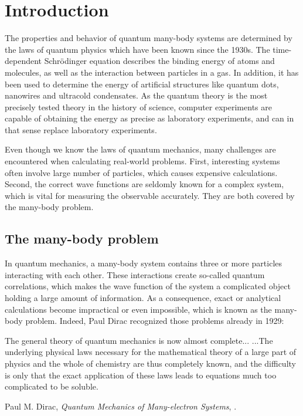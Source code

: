\chapter{Introduction}
The properties and behavior of quantum many-body systems are determined by the laws of quantum physics which have been known since the 1930s. The time-dependent Schrödinger equation describes the binding energy of atoms and molecules, as well as the interaction between particles in a gas. In addition, it has been used to determine the energy of artificial structures like quantum dots, nanowires and ultracold condensates. As the quantum theory is the most precisely tested theory in the history of science, computer experiments are capable of obtaining the energy as precise as laboratory experiments, and can in that sense replace laboratory experiments. 



Even though we know the laws of quantum mechanics, many challenges are encountered when calculating real-world problems. First, interesting systems often involve large number of particles, which causes expensive calculations. Second, the correct wave functions are seldomly known for a complex system, which is vital for measuring the observable accurately. They are both covered by the many-body problem. 

\section{The many-body problem}
In quantum mechanics, a many-body system contains three or more particles interacting with each other. These interactions create so-called quantum correlations, which makes the wave function of the system a complicated object holding a large amount of information. As a consequence, exact or analytical calculations become impractical or even impossible, which is known as the many-body problem. Indeed, Paul Dirac recognized those problems already in 1929:

\begin{shadequote}{
		The general theory of quantum mechanics is now almost complete... ...The underlying physical laws necessary for the mathematical theory of a large part of physics and the whole of chemistry are thus completely known, and the difficulty is only that the exact application of these laws leads to equations much too complicated to be soluble. \par Paul M. Dirac, \emph{Quantum Mechanics of Many-electron Systems}, \cite{dirac_paul_adrien_maurice_quantum_1929}.}
\end{shadequote}

